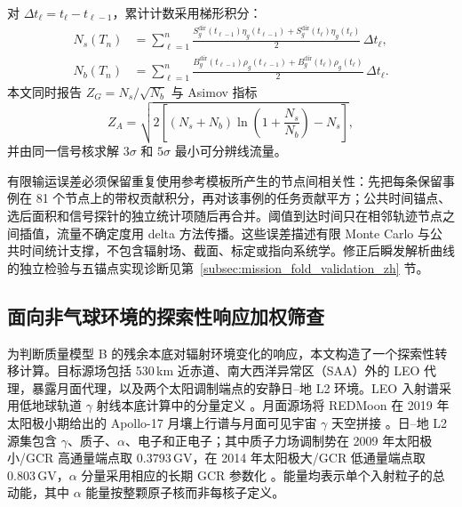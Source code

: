 \documentclass[11pt]{article}
\begin{document}
对 $\Delta t_\ell=t_\ell-t_{\ell-1}$，累计计数采用梯形积分：
\begin{equation}
 \begin{aligned}
 N_s(T_n)&=\sum_{\ell=1}^{n}\frac{S^{\mathrm{dir}}_g(t_{\ell-1})\eta_g(t_{\ell-1})+S^{\mathrm{dir}}_g(t_\ell)\eta_g(t_\ell)}{2}\,\Delta t_\ell,\\
 N_b(T_n)&=\sum_{\ell=1}^{n}\frac{B^{\mathrm{dir}}_g(t_{\ell-1})\rho_g(t_{\ell-1})+B^{\mathrm{dir}}_g(t_\ell)\rho_g(t_\ell)}{2}\,\Delta t_\ell.
 \end{aligned}
 \label{eq:cumulative_counts_zh}
\end{equation}
本文同时报告 $Z_G=N_s/\sqrt{N_b}$ 与 Asimov 指标
\begin{equation}
 Z_A=\sqrt{2\left[(N_s+N_b)\ln\left(1+\frac{N_s}{N_b}\right)-N_s\right]},
\end{equation}
并由同一信号核求解 $3\sigma$ 和 $5\sigma$ 最小可分辨线流量。

有限输运误差必须保留重复使用参考模板所产生的节点间相关性：先把每条保留事例在 81 个节点上的带权贡献积分，再对该事例的任务贡献平方；公共时间锚点、选后面积和信号探针的独立统计项随后再合并。阈值到达时间只在相邻轨迹节点之间插值，流量不确定度用 delta 方法传播。这些误差描述有限 Monte Carlo 与公共时间统计支撑，不包含辐射场、截面、标定或指向系统学。修正后瞬发解析曲线的独立检验与五锚点实现诊断见第~\ref{subsec:mission_fold_validation_zh} 节。

\subsection{面向非气球环境的探索性响应加权筛查}
\label{subsec:environment_transfer_method}

为判断质量模型 B 的残余本底对辐射环境变化的响应，本文构造了一个探索性转移计算。目标源场包括 530\,km 近赤道、南大西洋异常区（SAA）外的 LEO 代理，暴露月面代理，以及两个太阳调制端点的安静日--地 L2 环境。LEO 入射谱采用低地球轨道 $\gamma$ 射线本底计算中的分量定义 \cite{Cumani2019LEO}。月面源场将 REDMoon 在 2019 年太阳极小期给出的 Apollo-17 月壤上行谱与月面可见宇宙 $\gamma$ 天空拼接 \cite{Dobynde2021REDMoon}。日--地 L2 源集包含 $\gamma$、质子、$\alpha$、电子和正电子；其中质子力场调制势在 2009 年太阳极小/GCR 高通量端点取 $0.3793$\,GV，在 2014 年太阳极大/GCR 低通量端点取 $0.803$\,GV，$\alpha$ 分量采用相应的长期 GCR 参数化 \cite{Lotti2021Athena,Usoskin2005,Kuznetsov2017}。能量均表示单个入射粒子的总动能，其中 $\alpha$ 能量按整颗原子核而非每核子定义。
\end{document}
